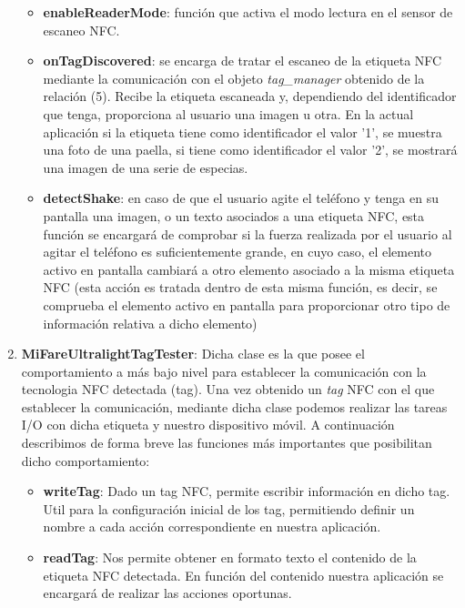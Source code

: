 \begin{enumerate}
		\begin{itemize}
			\item \textbf{enableReaderMode}: función que activa el modo lectura en el sensor de escaneo NFC.
			\item \textbf{onTagDiscovered}: se encarga de tratar el escaneo de la etiqueta NFC mediante la comunicación con el objeto \textit{tag\_manager} obtenido de la relación (5). Recibe la etiqueta escaneada y, dependiendo del identificador que tenga, proporciona al usuario una imagen u otra. En la actual aplicación si la etiqueta tiene como identificador el valor '1', se muestra una foto de una paella, si tiene como identificador el valor '2', se mostrará una imagen de una serie de especias.
			\item \textbf{detectShake}: en caso de que el usuario agite el teléfono y tenga en su pantalla una imagen, o un texto asociados a una etiqueta NFC, esta función se encargará de comprobar si la fuerza realizada por el usuario al agitar el teléfono es suficientemente grande, en cuyo caso, el elemento activo en pantalla cambiará a otro elemento asociado a la misma etiqueta NFC (esta acción es tratada dentro de esta misma función, es decir, se comprueba el elemento activo en pantalla para proporcionar otro tipo de información relativa a dicho elemento)
		\end{itemize}
	
	
	\item \textbf{MiFareUltralightTagTester}: Dicha clase es la que posee el comportamiento a más bajo nivel para establecer la comunicación con la tecnologia NFC detectada (tag). Una vez obtenido un \textit{tag} NFC con el que establecer la comunicación, mediante dicha clase podemos realizar las tareas I/O con dicha etiqueta y nuestro dispositivo móvil. 
	A continuación describimos de forma breve las funciones más importantes que posibilitan dicho comportamiento:
	
	\begin{itemize}
		\item \textbf{writeTag}: Dado un tag NFC, permite escribir información en dicho tag. Util para la configuración inicial de los tag, permitiendo definir un nombre a cada acción correspondiente en nuestra aplicación.
		\item \textbf{readTag}: Nos permite obtener en formato texto el contenido de la etiqueta NFC detectada. En función del contenido nuestra aplicación se encargará de realizar las acciones oportunas.
	\end{itemize}




\end{enumerate}
